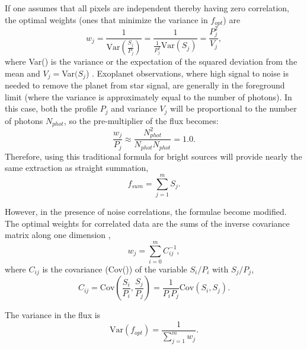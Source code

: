 \documentclass[]{aastex62}
\begin{document}
If one assumes that all pixels are independent thereby having zero correlation, the optimal weights (ones that minimize the variance in $f_{opt}$) are
\begin{equation}\label{eq:varianceweights}
w_j = \frac{1}{\mathrm{Var}(\frac{S_j}{P_j})} = \frac{1}{\frac{1}{P_j^2} \mathrm{Var}(S_j)} = \frac{P_j^2}{V_j},
\end{equation}
where Var() is the variance or the expectation of the squared deviation from the mean and $V_j =$Var$(S_j$) \citep{horne1986optimalE}.
Exoplanet observations, where high signal to noise is needed to remove the planet from star signal, are generally in the foreground limit (where the variance is approximately equal to the number of photons).
In this case, both the profile $P_j$ and variance $V_j$ will be proportional to the number of photons $N_{phot}$, so the pre-multiplier of the flux becomes:           
\begin{equation*}
\frac{w_j}{P_j} \approx \frac{N_{phot}^2}{N_{phot} N_{phot}} = 1.0.
\end{equation*}
Therefore, using this traditional formula for bright sources will provide nearly the same extraction as straight summation,
\begin{equation}\label{eq:StraightSummation}
f_{sum} = \sum_{j=1}^{m} S_j.
\end{equation} 

However, in the presence of noise correlations, the formulae become modified.
The optimal weights for correlated data are the sums of the inverse covariance matrix along one dimension  \citep{schmelling1995averagingCorrelatedData},
\begin{equation}\label{eq:covarianceweights}
w_j = \sum_{i=0}^{m} C_{ij}^{-1},
\end{equation}
where $C_{ij}$ is the covariance (Cov()) of the variable $S_i/P_i$ with $S_j/P_j$,
\begin{equation}
C_{ij} = \mathrm{Cov}\left(\frac{S_i}{P_i},\frac{S_j}{P_j}\right) = \frac{1}{P_i P_j} \mathrm{Cov}(S_i,S_j).
\end{equation}

The variance in the flux is
\begin{equation}
\mathrm{Var}(f_{opt}) = \frac{1}{\sum_{j=1}^m w_j}.
\end{equation}
\end{document}
